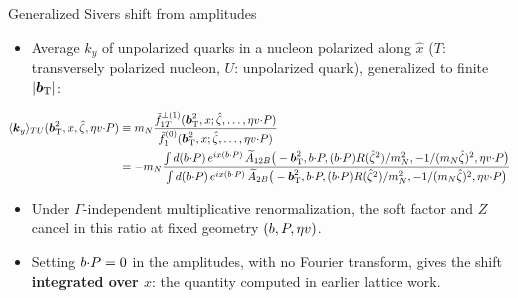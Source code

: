 \begin{frame}{Generalized Sivers shift from amplitudes}
  \begin{itemize}
    \item Average $k_y$ of unpolarized quarks in a nucleon polarized along $\hat x$ ($T$: transversely polarized nucleon, $U$: unpolarized quark), generalized to finite $|\boldsymbol{b}_{\mathrm T}|$:
  \end{itemize}
  \begin{block}{}
  \footnotesize
  \begin{align*}
    \langle \boldsymbol{k}_y \rangle_{TU}(\boldsymbol{b}_{\mathrm T}^2,x,{\hat \zeta},\eta v {\cdot} P)
    &\equiv m_N \frac{\tilde f_{1T}^{\perp(1)}(\boldsymbol{b}_{\mathrm T}^2,x;{\hat \zeta},\ldots,\eta v {\cdot} P)}{\tilde f_1^{(0)}(\boldsymbol{b}_{\mathrm T}^2,x;{\hat \zeta},\ldots,\eta v {\cdot} P)}\\
    &=-m_N \frac{\int d(b{\cdot} P)\,e^{ix(b{\cdot} P)}\, \widetilde{A}_{12B}\big(-\boldsymbol{b}_{\mathrm T}^2,b {\cdot} P,(b {\cdot} P) R({\hat \zeta}^2)/m_N^2,-1/(m_N{\hat \zeta})^2,\eta v {\cdot} P\big)}{\int d(b{\cdot} P)\,e^{ix(b{\cdot} P)}\,\widetilde{A}_{2B}\big(-\boldsymbol{b}_{\mathrm T}^2,b {\cdot} P,(b {\cdot} P) R({\hat \zeta}^2)/m_N^2,-1/(m_N{\hat \zeta})^2,\eta v {\cdot} P\big)}
  \end{align*}
  \end{block}
  \begin{itemize}
    \item Under $\Gamma$-independent multiplicative renormalization, the soft factor and $Z$ cancel in this ratio at fixed geometry $(b,P,\eta v)$.
    \item Setting $b{\cdot} P=0$ in the amplitudes, with no Fourier transform, gives the shift \textbf{integrated over $x$}: the quantity computed in earlier lattice work.
  \end{itemize}
\end{frame}
